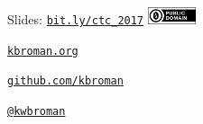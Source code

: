 \documentclass[12pt,t]{beamer}
\begin{document}
\begin{frame}[c]{}

\Large

Slides: \href{http://bit.ly/ctc_2017}{\tt bit.ly/ctc\_2017} \quad
\includegraphics[height=5mm]{Figs/cc-zero.png}

\vspace{10mm}

\href{http://kbroman.org}{\tt kbroman.org}

\vspace{10mm}

\href{https://github.com/kbroman}{\tt github.com/kbroman}

\vspace{10mm}

\href{https://twitter.com/kwbroman}{\tt @kwbroman}


\end{frame}
\end{document}
